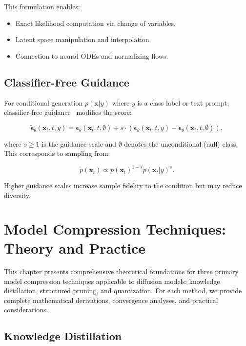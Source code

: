 \documentclass[12pt]{report}
\theoremstyle{definition}
\begin{document}
This formulation enables:
\begin{itemize}
\item Exact likelihood computation via change of variables.
\item Latent space manipulation and interpolation.
\item Connection to neural ODEs and normalizing flows.
\end{itemize}

\section{Classifier-Free Guidance}

For conditional generation $p(\mathbf{x}|y)$ where $y$ is a class label or text prompt, classifier-free guidance~\citep{ho2022classifier} modifies the score:

\begin{equation}
\tilde{\boldsymbol{\epsilon}}_\theta(\mathbf{x}_t, t, y) = \boldsymbol{\epsilon}_\theta(\mathbf{x}_t, t, \emptyset) + s \cdot (\boldsymbol{\epsilon}_\theta(\mathbf{x}_t, t, y) - \boldsymbol{\epsilon}_\theta(\mathbf{x}_t, t, \emptyset)),
\label{eq:cfg}
\end{equation}

where $s \geq 1$ is the guidance scale and $\emptyset$ denotes the unconditional (null) class. This corresponds to sampling from:

\begin{equation}
\tilde{p}(\mathbf{x}_t) \propto p(\mathbf{x}_t)^{1-s} p(\mathbf{x}_t|y)^s.
\label{eq:cfg_distribution}
\end{equation}

Higher guidance scales increase sample fidelity to the condition but may reduce diversity.

\chapter{Model Compression Techniques: Theory and Practice}

This chapter presents comprehensive theoretical foundations for three primary model compression techniques applicable to diffusion models: knowledge distillation, structured pruning, and quantization. For each method, we provide complete mathematical derivations, convergence analyses, and practical considerations.

\section{Knowledge Distillation}
\end{document}
